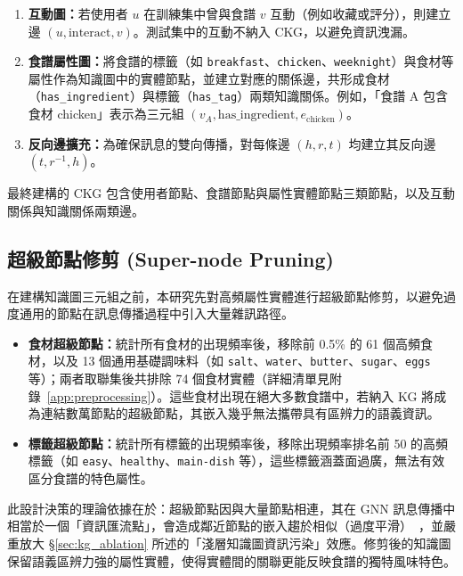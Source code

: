 \begin{enumerate}[leftmargin=2em]
  \item \textbf{互動圖：}若使用者 $u$ 在訓練集中曾與食譜 $v$ 互動（例如收藏或評分），則建立邊 $(u, \text{interact}, v)$。測試集中的互動不納入 CKG，以避免資訊洩漏。
  \item \textbf{食譜屬性圖：}將食譜的標籤（如 \texttt{breakfast}、\texttt{chicken}、\texttt{weeknight}）與食材等屬性作為知識圖中的實體節點，並建立對應的關係邊，共形成食材（\texttt{has\_ingredient}）與標籤（\texttt{has\_tag}）兩類知識關係。例如，「食譜 A 包含食材 chicken」表示為三元組 $(v_A, \text{has\_ingredient}, e_\text{chicken})$。
  \item \textbf{反向邊擴充：}為確保訊息的雙向傳播，對每條邊 $(h, r, t)$ 均建立其反向邊 $(t, r^{-1}, h)$。
\end{enumerate}

最終建構的 CKG 包含使用者節點、食譜節點與屬性實體節點三類節點，以及互動關係與知識關係兩類邊。

\subsection*{超級節點修剪 (Super-node Pruning)}
  \label{sec:supernode_pruning}

在建構知識圖三元組之前，本研究先對高頻屬性實體進行超級節點修剪，以避免過度通用的節點在訊息傳播過程中引入大量雜訊路徑。

\begin{itemize}[leftmargin=2em]
  \item \textbf{食材超級節點：}統計所有食材的出現頻率後，移除前 0.5\% 的 61 個高頻食材，以及 13 個通用基礎調味料（如 \texttt{salt}、\texttt{water}、\texttt{butter}、\texttt{sugar}、\texttt{eggs} 等）；兩者取聯集後共排除 74 個食材實體（詳細清單見附錄~\ref{app:preprocessing}）。這些食材出現在絕大多數食譜中，若納入 KG 將成為連結數萬節點的超級節點，其嵌入幾乎無法攜帶具有區辨力的語義資訊。
  \item \textbf{標籤超級節點：}統計所有標籤的出現頻率後，移除出現頻率排名前 50 的高頻標籤（如 \texttt{easy}、\texttt{healthy}、\texttt{main-dish} 等），這些標籤涵蓋面過廣，無法有效區分食譜的特色屬性。
\end{itemize}

此設計決策的理論依據在於：超級節點因與大量節點相連，其在 GNN 訊息傳播中相當於一個「資訊匯流點」，會造成鄰近節點的嵌入趨於相似（過度平滑）~\cite{li2018deeper}，並嚴重放大 §\ref{sec:kg_ablation} 所述的「淺層知識圖資訊污染」效應。修剪後的知識圖保留語義區辨力強的屬性實體，使得實體間的關聯更能反映食譜的獨特風味特色。


